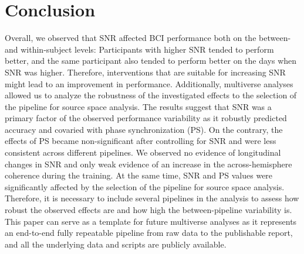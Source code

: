 \section{Conclusion}

Overall, we observed that SNR affected BCI performance both on the between- and within-subject levels: Participants with higher SNR tended to perform better, and the same participant also tended to perform better on the days when SNR was higher. Therefore, interventions that are suitable for increasing SNR might lead to an improvement in performance. Additionally, multiverse analyses allowed us to analyze the robustness of the investigated effects to the selection of the pipeline for source space analysis. The results suggest that SNR was a primary factor of the observed performance variability as it robustly predicted accuracy and covaried with phase synchronization (PS). On the contrary, the effects of PS became non-significant after controlling for SNR and were less consistent across different pipelines. We observed no evidence of longitudinal changes in SNR and only weak evidence of an increase in the across-hemisphere coherence during the training. At the same time, SNR and PS values were significantly affected by the selection of the pipeline for source space analysis. Therefore, it is necessary to include several pipelines in the analysis to assess how robust the observed effects are and how high the between-pipeline variability is. This paper can serve as a template for future multiverse analyses as it represents an end-to-end fully repeatable pipeline from raw data to the publishable report, and all the underlying data and scripts are publicly available.